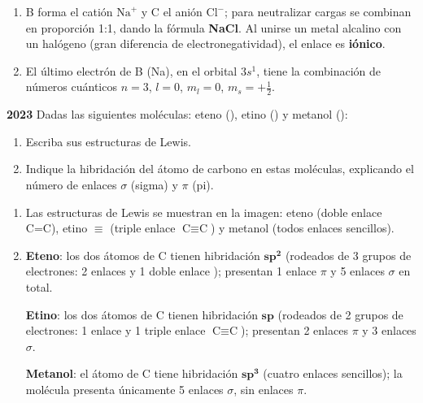 \begin{exerciseEVAU}
\begin{solu}
\begin{enumerate}[label=\letraminuscula]
            El radio atómico disminuye hacia la derecha en un periodo, por lo que \textbf{B (Na) tiene mayor radio atómico} que C (Cl).

            \item B forma el catión \(\text{Na}^+\) y C el anión \(\text{Cl}^-\); para neutralizar cargas se combinan en proporción 1:1, dando la fórmula \textbf{NaCl}. Al unirse un metal alcalino con un halógeno (gran diferencia de electronegatividad), el enlace es \textbf{iónico}.

            \item El último electrón de B (Na), en el orbital \(3s^1\), tiene la combinación de números cuánticos \(n=3\), \(l=0\), \(m_l=0\), \(m_s=+\tfrac{1}{2}\).
        \end{enumerate}
    \end{solu}
\end{exerciseEVAU}
\begin{exerciseEVAU}
    \textbf{2023} Dadas las siguientes moléculas: eteno (), etino () y metanol ():
    \begin{enumerate}[label=\letraminuscula]
        \item Escriba sus estructuras de Lewis.
        \item Indique la hibridación del átomo de carbono en estas moléculas, explicando el número de enlaces
        \(\sigma\) (sigma) y \(\pi\) (pi).
    \end{enumerate}

    \begin{solu}


        \begin{enumerate}[label=\letraminuscula]
            \item Las estructuras de Lewis se muestran en la imagen: eteno  (doble enlace C=C), etino  \(\equiv\)  (triple enlace \(\text{C}\equiv\text{C}\)) y metanol  (todos enlaces sencillos).

            \item \textbf{Eteno}: los dos átomos de C tienen hibridación \(\bm{sp^2}\) (rodeados de 3 grupos de electrones: 2 enlaces  y 1 doble enlace ); presentan 1 enlace \(\pi\) y 5 enlaces \(\sigma\) en total.

            \textbf{Etino}: los dos átomos de C tienen hibridación \(\bm{sp}\) (rodeados de 2 grupos de electrones: 1 enlace  y 1 triple enlace \(\text{C}\equiv\text{C}\)); presentan 2 enlaces \(\pi\) y 3 enlaces \(\sigma\).

            \textbf{Metanol}: el átomo de C tiene hibridación \(\bm{sp^3}\) (cuatro enlaces sencillos); la molécula presenta únicamente 5 enlaces \(\sigma\), sin enlaces \(\pi\).
        \end{enumerate}
    \end{solu}
\end{exerciseEVAU}

